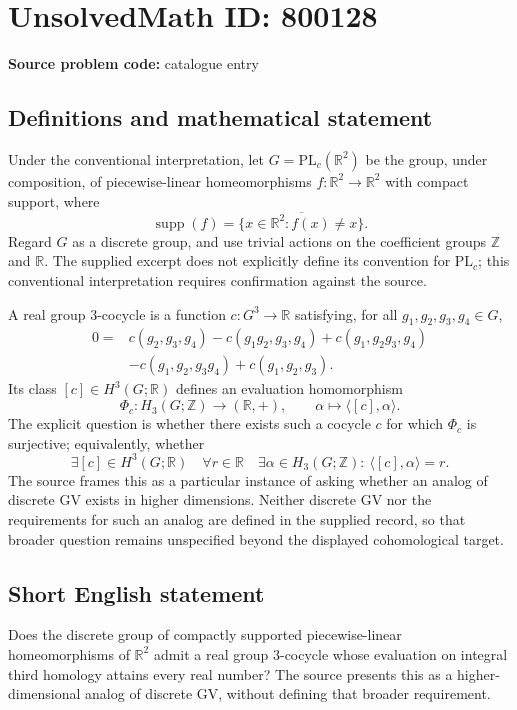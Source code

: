 \documentclass[11pt]{article}
\newcommand{\Z}{\mathbb{Z}}
\newcommand{\R}{\mathbb{R}}
\begin{document}
\section*{UnsolvedMath ID: 800128}
\textbf{Source problem code:} catalogue entry
\subsection{Definitions and mathematical statement}
Under the conventional interpretation, let \(G=\mathrm{PL}_c(\R^2)\) be the group, under composition, of piecewise-linear homeomorphisms \(f:\R^2\to\R^2\) with compact support, where
\[
\operatorname{supp}(f)=\overline{\{x\in\R^2:f(x)\ne x\}}.
\]
Regard \(G\) as a discrete group, and use trivial actions on the coefficient groups \(\Z\) and \(\R\). The supplied excerpt does not explicitly define its convention for \(\mathrm{PL}_c\); this conventional interpretation requires confirmation against the source.

A real group \(3\)-cocycle is a function \(c:G^3\to\R\) satisfying, for all \(g_1,g_2,g_3,g_4\in G\),
\[
\begin{aligned}
0={}&c(g_2,g_3,g_4)-c(g_1g_2,g_3,g_4)
+c(g_1,g_2g_3,g_4)\\
&-c(g_1,g_2,g_3g_4)+c(g_1,g_2,g_3).
\end{aligned}
\]
Its class \([c]\in H^3(G;\R)\) defines an evaluation homomorphism
\[
\Phi_c:H_3(G;\Z)\longrightarrow(\R,+),\qquad
\alpha\longmapsto\langle[c],\alpha\rangle.
\]
The explicit question is whether there exists such a cocycle \(c\) for which \(\Phi_c\) is surjective; equivalently, whether
\[
\exists[c]\in H^3(G;\R)\quad\forall r\in\R\quad
\exists\alpha\in H_3(G;\Z):\ \langle[c],\alpha\rangle=r.
\]
The source frames this as a particular instance of asking whether an analog of discrete \(\mathrm{GV}\) exists in higher dimensions. Neither discrete \(\mathrm{GV}\) nor the requirements for such an analog are defined in the supplied record, so that broader question remains unspecified beyond the displayed cohomological target.
\subsection{Short English statement}
Does the discrete group of compactly supported piecewise-linear homeomorphisms of \(\R^2\) admit a real group \(3\)-cocycle whose evaluation on integral third homology attains every real number? The source presents this as a higher-dimensional analog of discrete \(\mathrm{GV}\), without defining that broader requirement.
\end{document}
